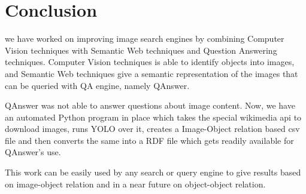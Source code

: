 \documentclass[12pt]{article}
\begin{document}
\section{Conclusion}
we have worked on improving image search engines by combining Computer Vision
techniques with Semantic Web techniques and Question Answering techniques. Computer Vision techniques is able
to identify objects into images, and Semantic Web techniques give a semantic
representation of the images that can be queried with QA engine, namely
QAnswer.

QAnswer was not able to answer questions about image content. Now, we
have an automated Python program in place
which takes the special wikimedia api to download images, runs YOLO over
it, creates a
Image-Object relation based csv file and then converts the same into a
RDF file which gets
readily available for QAnswer’s use.

This work can be easily used by any
search or query engine to give results based on image-object relation
and in a near future on object-object
relation.



\end{document}
